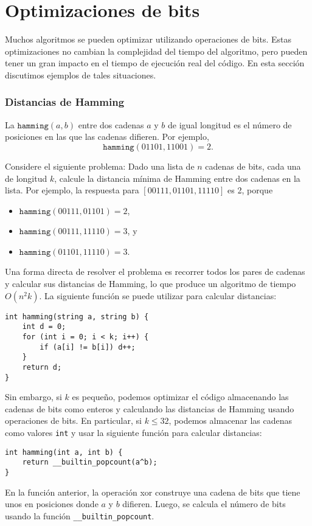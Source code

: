 \section{Optimizaciones de bits}

Muchos algoritmos se pueden optimizar utilizando
operaciones de bits.
Estas optimizaciones no cambian la
complejidad del tiempo del algoritmo,
pero pueden tener un gran impacto
en el tiempo de ejecución real del código.
En esta sección discutimos ejemplos
de tales situaciones.

\subsubsection{Distancias de Hamming}

La 
$\texttt{hamming}(a,b)$ entre dos
cadenas $a$ y $b$ de igual longitud es
el número de posiciones en las que las cadenas difieren.
Por ejemplo,
\[\texttt{hamming}(01101,11001)=2.\]

Considere el siguiente problema: Dado
una lista de $n$ cadenas de bits, cada una de longitud $k$,
calcule la distancia mínima de Hamming
entre dos cadenas en la lista.
Por ejemplo, la respuesta para $[00111,01101,11110]$
es 2, porque
\begin{itemize}[noitemsep]
\item $\texttt{hamming}(00111,01101)=2$,
\item $\texttt{hamming}(00111,11110)=3$, y
\item $\texttt{hamming}(01101,11110)=3$.
\end{itemize}

Una forma directa de resolver el problema es
recorrer todos los pares de cadenas y calcular
sus distancias de Hamming,
lo que produce un algoritmo de tiempo $O(n^2 k)$.
La siguiente función se puede utilizar para
calcular distancias:
\begin{lstlisting}
int hamming(string a, string b) {
    int d = 0;
    for (int i = 0; i < k; i++) {
        if (a[i] != b[i]) d++;
    }
    return d;
}
\end{lstlisting}

Sin embargo, si $k$ es pequeño, podemos optimizar el código
almacenando las cadenas de bits como enteros y
calculando las distancias de Hamming usando operaciones de bits.
En particular, si $k \le 32$, podemos almacenar
las cadenas como valores \texttt{int} y usar la
siguiente función para calcular distancias:
\begin{lstlisting}
int hamming(int a, int b) {
    return __builtin_popcount(a^b);
}
\end{lstlisting}
En la función anterior, la operación xor construye
una cadena de bits que tiene unos en posiciones
donde $a$ y $b$ difieren.
Luego, se calcula el número de bits usando
la función \texttt{\_\_builtin\_popcount}.

